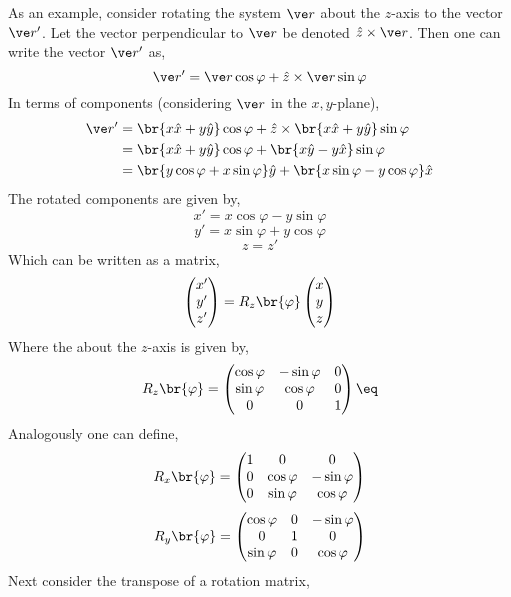 \documentclass{article}
\begin{document}
As an example, consider rotating the system $\ve r$ about the $z$-axis to the vector $\ve r'$. Let the vector perpendicular to $\ve r$ be denoted $\hat z \times \ve r$. Then one can write the vector $\ve r'$ as,
\[ \ve r' = \ve r \cos \varphi + \hat z \times \ve r \sin \varphi \]
In terms of components (considering $\ve r$ in the $x,y$-plane),
\begin{align*}
\ve r' &= \br{x \hat x + y \hat y} \cos \varphi + \hat z \times \br{x \hat x + y \hat y} \sin \varphi \\
&= \br{x \hat x + y \hat y} \cos \varphi + \br{x \hat y - y \hat x} \sin \varphi \\
&= \br{y\cos \varphi + x\sin \varphi} \hat y + \br{x\sin \varphi - y\cos \varphi} \hat x
\end{align*}
The rotated components are given by,
\[ x' = x \cos \varphi - y \sin \varphi  \]
\[ y' = x \sin \varphi + y \cos \varphi  \]
\[ z = z' \]
Which can be written as a matrix,
\[ \begin{pmatrix}x'\\y'\\z'\end{pmatrix} = R_{z}\br{\varphi} \begin{pmatrix}x\\y\\z\end{pmatrix} \]
Where the  about the $z$-axis is given by,
\[ R_{z}\br{\varphi} = \begin{pmatrix}
    \cos \varphi & - \sin \varphi & 0 \\
    \sin \varphi & \cos \varphi & 0 \\
    0 & 0 & 1 \\
\end{pmatrix} \eq \label{eq:rotate_z}\]
Analogously one can define,
\[ R_{x}\br{\varphi} = \begin{pmatrix}
    1 & 0 & 0 \\
    0 & \cos \varphi & - \sin \varphi \\
    0 & \sin \varphi & \cos \varphi \\
\end{pmatrix} \]
\[ R_{y}\br{\varphi} = \begin{pmatrix}
    \cos \varphi & 0 & - \sin \varphi \\
    0 & 1 & 0 \\
    \sin \varphi & 0 & \cos \varphi \\
\end{pmatrix} \]
Next consider the transpose of a rotation matrix,
\end{document}
